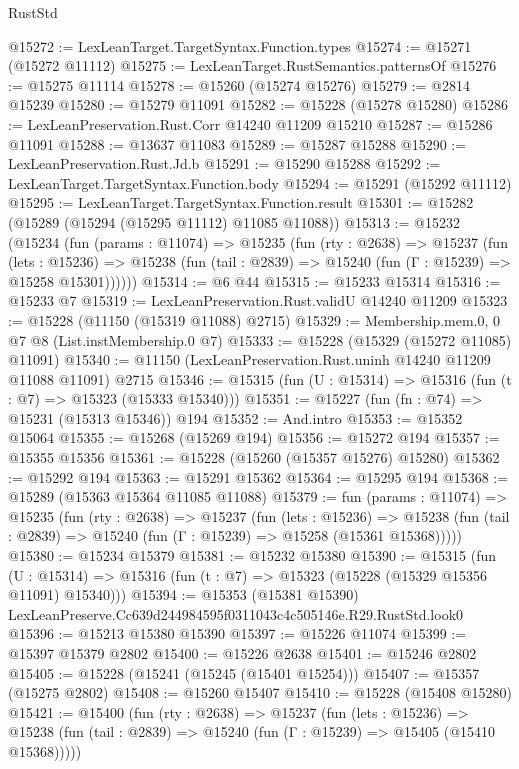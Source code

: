 \begin{lexlean}{RustStd}
\begin{coremodule}
@15272 := LexLeanTarget.TargetSyntax.Function.types
@15274 := @15271 (@15272 @11112)
@15275 := LexLeanTarget.RustSemantics.patternsOf
@15276 := @15275 @11114
@15278 := @15260 (@15274 @15276)
@15279 := @2814 @15239
@15280 := @15279 @11091
@15282 := @15228 (@15278 @15280)
@15286 := LexLeanPreservation.Rust.Corr @14240 @11209 @15210
@15287 := @15286 @11091
@15288 := @13637 @11083
@15289 := @15287 @15288
@15290 := LexLeanPreservation.Rust.Jd.b
@15291 := @15290 @15288
@15292 := LexLeanTarget.TargetSyntax.Function.body
@15294 := @15291 (@15292 @11112)
@15295 := LexLeanTarget.TargetSyntax.Function.result
@15301 := @15282 (@15289 (@15294 (@15295 @11112) @11085 @11088))
@15313 := @15232
    (@15234
      (fun (params : @11074) =>
      @15235
        (fun (rty : @2638) =>
        @15237
          (fun (lets : @15236) =>
          @15238 (fun (tail : @2839) => @15240 (fun (Γ : @15239) => @15258 @15301))))))
@15314 := @6 @44
@15315 := @15233 @15314
@15316 := @15233 @7
@15319 := LexLeanPreservation.Rust.validU @14240 @11209
@15323 := @15228 (@11150 (@15319 @11088) @2715)
@15329 := Membership.mem.{0, 0} @7 @8 (List.instMembership.{0} @7)
@15333 := @15228 (@15329 (@15272 @11085) @11091)
@15340 := @11150 (LexLeanPreservation.Rust.uninh @14240 @11209 @11088 @11091) @2715
@15346 := @15315 (fun (U : @15314) => @15316 (fun (t : @7) => @15323 (@15333 @15340)))
@15351 := @15227 (fun (fn : @74) => @15231 (@15313 @15346)) @194
@15352 := And.intro
@15353 := @15352 @15064
@15355 := @15268 (@15269 @194)
@15356 := @15272 @194
@15357 := @15355 @15356
@15361 := @15228 (@15260 (@15357 @15276) @15280)
@15362 := @15292 @194
@15363 := @15291 @15362
@15364 := @15295 @194
@15368 := @15289 (@15363 @15364 @11085 @11088)
@15379 := fun (params : @11074) =>
  @15235
    (fun (rty : @2638) =>
    @15237
      (fun (lets : @15236) =>
      @15238 (fun (tail : @2839) => @15240 (fun (Γ : @15239) => @15258 (@15361 @15368)))))
@15380 := @15234 @15379
@15381 := @15232 @15380
@15390 := @15315
    (fun (U : @15314) => @15316 (fun (t : @7) => @15323 (@15228 (@15329 @15356 @11091) @15340)))
@15394 := @15353 (@15381 @15390) LexLeanPreserve.Cc639d244984595f0311043c4c505146e.R29.RustStd.look0
@15396 := @15213 @15380 @15390
@15397 := @15226 @11074
@15399 := @15397 @15379 @2802
@15400 := @15226 @2638
@15401 := @15246 @2802
@15405 := @15228 (@15241 (@15245 (@15401 @15254)))
@15407 := @15357 (@15275 @2802)
@15408 := @15260 @15407
@15410 := @15228 (@15408 @15280)
@15421 := @15400
    (fun (rty : @2638) =>
    @15237
      (fun (lets : @15236) =>
      @15238 (fun (tail : @2839) => @15240 (fun (Γ : @15239) => @15405 (@15410 @15368)))))

\end{coremodule}
\end{lexlean}
